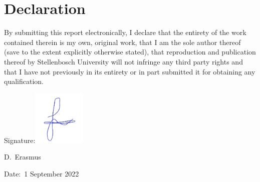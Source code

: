 \chapter{Declaration}

By submitting this report electronically, I declare that the entirety of the work contained
therein is my own, original work, that I am the sole author thereof (save to the extent
explicitly otherwise stated), that reproduction and publication thereof by Stellenbosch
University will not infringe any third party rights and that I have not previously in its
entirety or in part submitted it for obtaining any qualification.

\vspace{3cm}

\noindent%
\parbox{.5\textwidth}{%
  Signature:\quad\hfill\dotfill\includegraphics[width = 25mm]{figs/sig.png}\dotfill\par
  \hfill D.\ Erasmus\hspace{1.2cm}\null}


\vspace{1.5cm}
\noindent%
\parbox{.5\textwidth}{%
  Date:\quad\hfill\dotfill\ 1 September 2022\dotfill\par}
